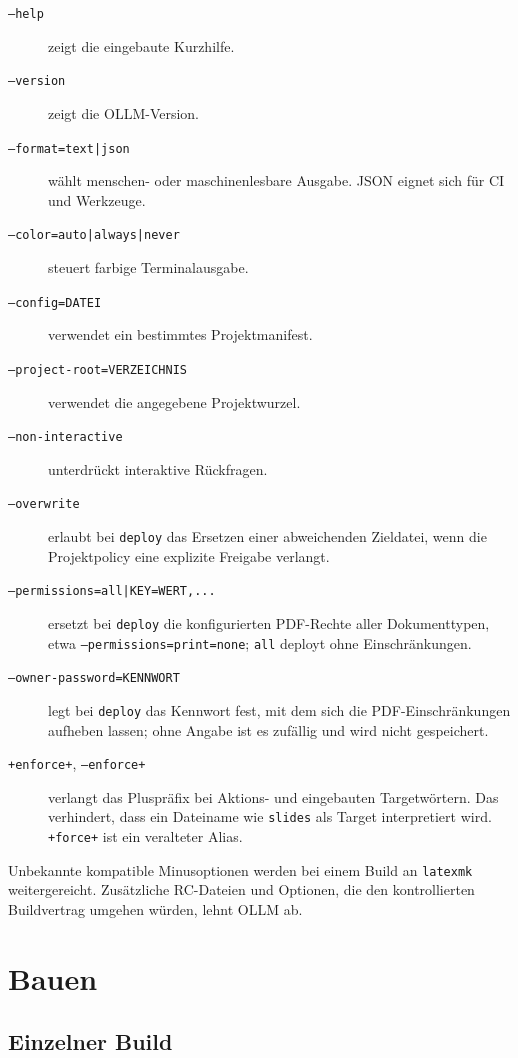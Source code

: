 \documentclass[
load-preamble+
]{osgdoc}
\begin{document}
\begin{description}
\item[\texttt{--help}] zeigt die eingebaute Kurzhilfe.
\item[\texttt{--version}] zeigt die OLLM-Version.
\item[\texttt{--format=text|json}] wählt menschen- oder maschinenlesbare
  Ausgabe. JSON eignet sich für CI und Werkzeuge.
\item[\texttt{--color=auto|always|never}] steuert farbige Terminalausgabe.
\item[\texttt{--config=DATEI}] verwendet ein bestimmtes Projektmanifest.
\item[\texttt{--project-root=VERZEICHNIS}] verwendet die angegebene
  Projektwurzel.
\item[\texttt{--non-interactive}] unterdrückt interaktive Rückfragen.
\item[\texttt{--overwrite}] erlaubt bei \texttt{deploy} das Ersetzen einer
  abweichenden Zieldatei, wenn die Projektpolicy eine explizite Freigabe
  verlangt.
\item[\texttt{--permissions=all|KEY=WERT,...}] ersetzt bei \texttt{deploy}
  die konfigurierten PDF-Rechte aller Dokumenttypen, etwa
  \texttt{--permissions=print=none}; \texttt{all} deployt ohne
  Einschränkungen.
\item[\texttt{--owner-password=KENNWORT}] legt bei \texttt{deploy} das
  Kennwort fest, mit dem sich die PDF-Einschränkungen aufheben lassen; ohne
  Angabe ist es zufällig und wird nicht gespeichert.
\item[\texttt{+enforce+}, \texttt{--enforce+}] verlangt das Pluspräfix bei
  Aktions- und eingebauten Targetwörtern. Das verhindert, dass ein Dateiname
  wie \texttt{slides} als Target interpretiert wird. \texttt{+force+} ist ein
  veralteter Alias.
\end{description}

Unbekannte kompatible Minusoptionen werden bei einem Build an \texttt{latexmk}
weitergereicht. Zusätzliche RC-Dateien und Optionen, die den kontrollierten
Buildvertrag umgehen würden, lehnt OLLM ab.

\section{Bauen}

\subsection{Einzelner Build}
\end{document}
